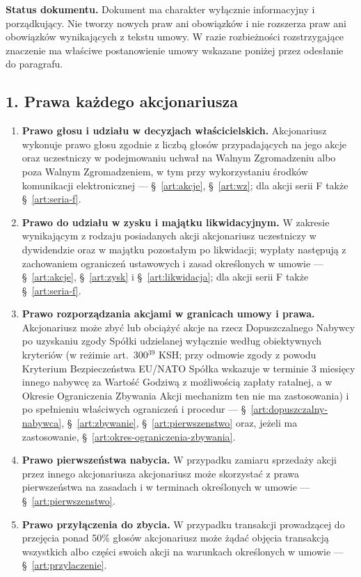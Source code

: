 \documentclass[12pt,a4paper]{report}
\newcounter{paragraf}
\begin{document}
\textbf{Status dokumentu.} Dokument ma charakter wyłącznie informacyjny i porządkujący. Nie tworzy nowych praw ani obowiązków i nie rozszerza praw ani obowiązków wynikających z tekstu umowy. W razie rozbieżności rozstrzygające znaczenie ma właściwe postanowienie umowy wskazane poniżej przez odesłanie do paragrafu.

\subsection*{1. Prawa każdego akcjonariusza}

\begin{enumerate}
  \item \textbf{Prawo głosu i udziału w decyzjach właścicielskich.} Akcjonariusz wykonuje prawo głosu zgodnie z liczbą głosów przypadających na jego akcje oraz uczestniczy w podejmowaniu uchwał na Walnym Zgromadzeniu albo poza Walnym Zgromadzeniem, w tym przy wykorzystaniu środków komunikacji elektronicznej --- §~\ref{art:akcje}, §~\ref{art:wz}; dla akcji serii F także §~\ref{art:seria-f}.
  \item \textbf{Prawo do udziału w zysku i majątku likwidacyjnym.} W zakresie wynikającym z rodzaju posiadanych akcji akcjonariusz uczestniczy w dywidendzie oraz w majątku pozostałym po likwidacji; wypłaty następują z zachowaniem ograniczeń ustawowych i zasad określonych w umowie --- §~\ref{art:akcje}, §~\ref{art:zysk} i §~\ref{art:likwidacja}; dla akcji serii F także §~\ref{art:seria-f}.
  \item \textbf{Prawo rozporządzania akcjami w granicach umowy i prawa.} Akcjonariusz może zbyć lub obciążyć akcje na rzecz Dopuszczalnego Nabywcy po uzyskaniu zgody Spółki udzielanej wyłącznie według obiektywnych kryteriów (w reżimie art.~300$^{39}$ KSH; przy odmowie zgody z powodu Kryterium Bezpieczeństwa EU/NATO Spółka wskazuje w terminie 3 miesięcy innego nabywcę za Wartość Godziwą z możliwością zapłaty ratalnej, a w Okresie Ograniczenia Zbywania Akcji mechanizm ten nie ma zastosowania) i po spełnieniu właściwych ograniczeń i procedur --- §~\ref{art:dopuszczalny-nabywca}, §~\ref{art:zbywanie}, §~\ref{art:pierwszenstwo} oraz, jeżeli ma zastosowanie, §~\ref{art:okres-ograniczenia-zbywania}.
  \item \textbf{Prawo pierwszeństwa nabycia.} W przypadku zamiaru sprzedaży akcji przez innego akcjonariusza akcjonariusz może skorzystać z prawa pierwszeństwa na zasadach i w terminach określonych w umowie --- §~\ref{art:pierwszenstwo}.
  \item \textbf{Prawo przyłączenia do zbycia.} W przypadku transakcji prowadzącej do przejęcia ponad 50\% głosów akcjonariusz może żądać objęcia transakcją wszystkich albo części swoich akcji na warunkach określonych w umowie --- §~\ref{art:przylaczenie}.

\end{enumerate}
\end{document}
